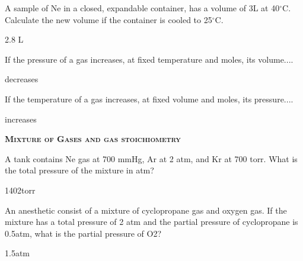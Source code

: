\documentclass[main.tex]{subfiles}
\begin{document}
\begin{multicols*}{2}
\begin{question}[ID=\the\value{numA}]
A sample of Ne in a closed, expandable container, has a volume of 3L at 40$^\circ$C. Calculate the new volume if the container is cooled to 25$^\circ$C.
\end{question}
\begin{solution}
2.8 L
\hspace{0.1cm}\end{solution}%
\begin{question}[ID=\the\value{numA}]
If the pressure of a gas increases, at fixed temperature and moles, its volume....
\end{question}
\begin{solution}
decreases
\hspace{0.1cm}\end{solution}%
\begin{question}[ID=\the\value{numA}]
If the temperature of a gas increases, at fixed volume and moles, its pressure....
\end{question}
\begin{solution}
increases
\hspace{0.1cm}\end{solution}%


{\raggedright\textsc{\textbf{Mixture of Gases and gas stoichiometry }}\par}
\begin{question}[ID=\the\value{numA}]
A tank contains Ne gas at 700 mmHg, Ar at 2 atm, and Kr at 700 torr. What is the total pressure of the mixture in atm?
\end{question}
\begin{solution}
1402torr
\hspace{0.1cm}\end{solution}%
\begin{question}[ID=\the\value{numA}]
An anesthetic consist of a mixture of cyclopropane gas and oxygen gas. If the mixture has a total pressure of 2 atm and the partial pressure of cyclopropane is 0.5atm, what is the partial pressure of O2?
\end{question}
\begin{solution}
1.5atm
\hspace{0.1cm}\end{solution}%




\end{multicols*}
\end{document}
